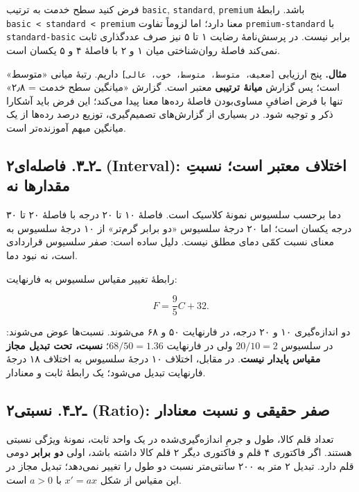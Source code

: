 \documentclass[12pt,a4paper,oneside]{book}
\begin{document}
فرض کنید سطح خدمت به ترتیب \texttt{basic}, \texttt{standard}, \texttt{premium} باشد. رابطهٔ \texttt{basic\ \textless{}\ standard\ \textless{}\ premium} معنا دارد؛ اما لزوماً تفاوت \texttt{premium-standard} با \texttt{standard-basic} برابر نیست. در پرسش‌نامهٔ رضایت ۱ تا ۵ نیز صرف عددگذاری ثابت نمی‌کند فاصلهٔ روان‌شناختی میان ۱ و ۲ با فاصلهٔ ۴ و ۵ یکسان است.

\textbf{مثال.} پنج ارزیابی \texttt{{[}ضعیف،\ متوسط،\ متوسط،\ خوب،\ عالی{]}} داریم. رتبهٔ میانی «متوسط» است؛ پس گزارش \textbf{میانهٔ ترتیبی} معتبر است. گزارش «میانگین سطح خدمت = ۲٫۸» تنها با فرض اضافیِ مساوی‌بودن فاصلهٔ رده‌ها معنا پیدا می‌کند؛ این فرض باید آشکارا ذکر و توجیه شود. در بسیاری از گزارش‌های تصمیم‌گیری، توزیع درصد رده‌ها از یک میانگین مبهم آموزنده‌تر است.

\subsection{۲ـ۲ـ۳. فاصله‌ای (Interval): اختلاف معتبر است؛ نسبتِ مقدارها نه}\label{ux640ux6f2ux640ux6f3.-ux641ux627ux635ux644ux647ux627ux6cc-interval-ux627ux62eux62aux644ux627ux641-ux645ux639ux62aux628ux631-ux627ux633ux62a-ux646ux633ux628ux62a-ux645ux642ux62fux627ux631ux647ux627-ux646ux647}

دما برحسب سلسیوس نمونهٔ کلاسیک است. فاصلهٔ ۱۰ تا ۲۰ درجه با فاصلهٔ ۲۰ تا ۳۰ درجه یکسان است؛ اما ۲۰ درجهٔ سلسیوس «دو برابر گرم‌تر» از ۱۰ درجهٔ سلسیوس به معنای نسبت کمّی دمای مطلق نیست. دلیل ساده است: صفر سلسیوس قراردادی است، نه نبود دما.

رابطهٔ تغییر مقیاس سلسیوس به فارنهایت:

\[
F=\frac{9}{5}C+32.
\]

دو اندازه‌گیری ۱۰ و ۲۰ درجه، در فارنهایت ۵۰ و ۶۸ می‌شوند. نسبت‌ها عوض می‌شوند: در سلسیوس \(20/10=2\) ولی در فارنهایت \(68/50=1.36\)؛ \textbf{نسبت، تحت تبدیل مجاز مقیاس پایدار نیست}. در مقابل، اختلاف ۱۰ درجهٔ سلسیوس به اختلاف ۱۸ درجهٔ فارنهایت تبدیل می‌شود؛ یک رابطهٔ ثابت و معنادار.

\subsection{۲ـ۲ـ۴. نسبتی (Ratio): صفر حقیقی و نسبت معنا‌دار}\label{ux640ux6f2ux640ux6f4.-ux646ux633ux628ux62aux6cc-ratio-ux635ux641ux631-ux62dux642ux6ccux642ux6cc-ux648-ux646ux633ux628ux62a-ux645ux639ux646ux627ux62fux627ux631}

تعداد قلم کالا، طول و جرمِ اندازه‌گیری‌شده در یک واحد ثابت، نمونهٔ ویژگی نسبتی هستند. اگر فاکتوری ۴ قلم و فاکتوری دیگر ۲ قلم کالا داشته باشد، اولی \textbf{دو برابر} دومی قلم دارد. تبدیل ۲ متر به ۲۰۰ سانتی‌متر نسبت دو طول را تغییر نمی‌دهد؛ تبدیل مجاز در این مقیاس از شکل \(x'=a x\) با \(a>0\) است.
\end{document}

